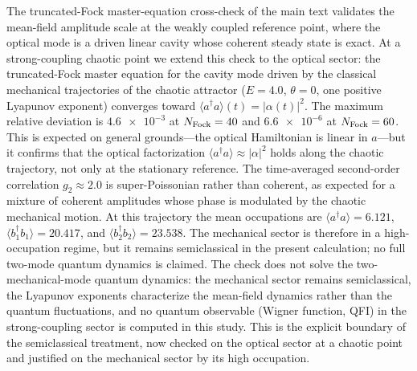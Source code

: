 \documentclass[Phys]{SciPost}
\begin{document}
The truncated-Fock master-equation cross-check of the main text validates the
mean-field amplitude scale at the weakly coupled reference point, where the
optical mode is a driven linear cavity whose coherent steady state is exact.
At a strong-coupling chaotic point we extend this check to the optical
sector: the truncated-Fock master equation for the cavity mode driven by the
classical mechanical trajectories of the chaotic attractor
($E=\num{4.0}$, $\theta=0$, one positive Lyapunov exponent) converges toward
$\langle a^\dagger a\rangle(t)=|\alpha(t)|^2$. The maximum relative deviation
is $\num{4.6e-3}$ at $N_{\rm Fock}=\num{40}$ and $\num{6.6e-6}$ at
$N_{\rm Fock}=\num{60}$. This is expected on
general grounds---the optical Hamiltonian is linear in $a$---but it confirms
that the optical factorization $\langle a^\dagger a\rangle\approx|\alpha|^2$
holds along the chaotic trajectory, not only at the stationary reference. The
time-averaged second-order correlation $g_2\approx\num{2.0}$ is
super-Poissonian rather than coherent, as expected for a mixture of coherent
amplitudes whose phase is modulated by the chaotic mechanical motion. At this
trajectory the mean occupations are $\langle a^\dagger a\rangle=\num{6.121}$,
$\langle b_1^\dagger b_1\rangle=\num{20.417}$, and
$\langle b_2^\dagger b_2\rangle=\num{23.538}$. The mechanical sector is
therefore in a high-occupation regime, but it remains semiclassical in the
present calculation; no full two-mode quantum dynamics is claimed. The check does not solve the
two-mechanical-mode quantum dynamics: the mechanical sector remains
semiclassical, the Lyapunov exponents characterize the mean-field dynamics
rather than the quantum fluctuations, and no quantum observable (Wigner
function, QFI) in the strong-coupling sector is computed in this study. This
is the explicit boundary of the semiclassical treatment, now checked on the
optical sector at a chaotic point and justified on the mechanical sector by
its high occupation.
\end{document}

